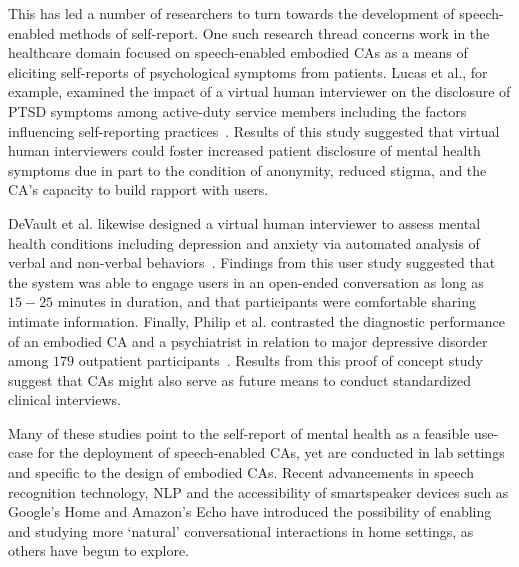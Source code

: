        This has led a number of researchers to turn towards the development of speech-enabled methods of self-report. One such research thread concerns work in the healthcare domain focused on speech-enabled embodied \ac{CA}s as a means of eliciting self-reports of psychological symptoms from patients. Lucas et al., for example, examined the impact of a virtual human interviewer on the disclosure of \ac{PTSD} symptoms among active-duty service members including the factors influencing self-reporting practices~\cite{lucas2017reporting}. Results of this study suggested that virtual human interviewers could foster increased patient disclosure of mental health symptoms due in part to the condition of anonymity, reduced stigma, and the \ac{CA}'s capacity to build rapport with users. 
        
        DeVault et al. likewise designed a virtual human interviewer to assess mental health conditions including depression and anxiety via automated analysis of verbal and non-verbal behaviors~\cite{devault2014simsensei}. Findings from this user study suggested that the system was able to engage users in an open-ended conversation as long as $15-25$ minutes in duration, and that participants were comfortable sharing intimate information. Finally, Philip et al. contrasted the diagnostic performance of an embodied \ac{CA} and a psychiatrist in relation to major depressive disorder among $179$ outpatient participants~\cite{philip2017virtual}. Results from this proof of concept study suggest that \ac{CA}s might also serve as future means to conduct standardized clinical interviews.
        
        Many of these studies point to the self-report of mental health as a feasible use-case for the deployment of speech-enabled \ac{CA}s, yet are conducted in lab settings and specific to the design of embodied \ac{CA}s. Recent advancements in speech recognition technology, \ac{NLP} and the accessibility of smartspeaker devices such as Google's Home and Amazon's Echo have introduced the possibility of enabling and studying more `natural' conversational interactions in home settings, as others have begun to explore.
     
